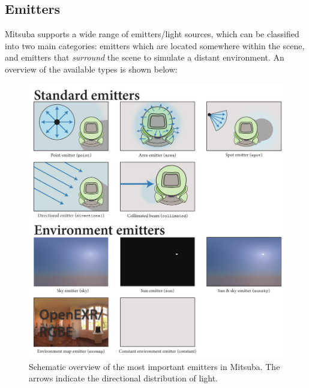 \newpage
\subsection{Emitters}
\label{sec:emitters}
Mitsuba supports a wide range of emitters/light sources, which can be classified
into two main categories: emitters which are located somewhere within the scene, and emitters
that \emph{surround} the scene to simulate a distant environment. An overview of the available
types is shown below:
\begin{figure}[h!]
\centering
\includegraphics[width=15.5cm]{images/emitter_overview.pdf}
\caption{
    Schematic overview of the most important emitters in Mitsuba.
    The arrows indicate the directional distribution of light.
}
\end{figure}

